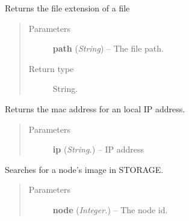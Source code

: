 \documentclass[letterpaper,10pt,english]{sphinxmanual}
\begin{document}

\begin{fulllineitems}
\label{api:utils.GetFileExtension}
Returns the file extension of a file
\begin{quote}\begin{description}
\item[{Parameters}] \leavevmode
\textbf{path} (\emph{String}) -- The file path.

\item[{Return type}] \leavevmode
String.

\end{description}\end{quote}

\end{fulllineitems}


\begin{fulllineitems}
\label{api:utils.GetMacForIp}
Returns the mac address for an local IP address.
\begin{quote}\begin{description}
\item[{Parameters}] \leavevmode
\textbf{ip} (\emph{String.}) -- IP address

\end{description}\end{quote}

\end{fulllineitems}


\begin{fulllineitems}
\label{api:utils.GetNodeImg}
Searches for a node's image in STORAGE.
\begin{quote}\begin{description}
\item[{Parameters}] \leavevmode
\textbf{node} (\emph{Integer.}) -- The node id.

\end{description}\end{quote}

\end{fulllineitems}
\end{document}
